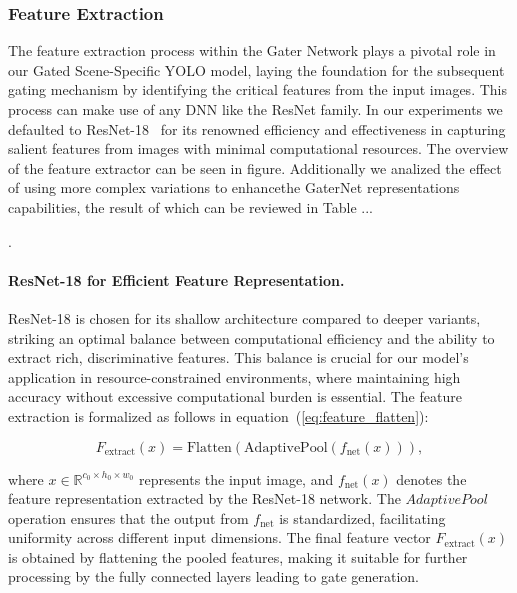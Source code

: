\subsubsection{Feature Extraction}
The feature extraction process within the Gater Network plays a pivotal role in our Gated Scene-Specific YOLO model, laying the foundation for the subsequent gating mechanism by identifying the critical features from the input images. This process can make use of any DNN like the ResNet family. In our experiments we defaulted to ResNet-18~\cite{he2016deep} for its renowned efficiency and effectiveness in capturing salient features from images with minimal computational resources. The overview of the feature extractor can be seen in figure. Additionally we analized the effect of using more complex variations to enhancethe GaterNet representations capabilities, the result of which can be reviewed in Table ... .

\paragraph{ResNet-18 for Efficient Feature Representation.} ResNet-18 is chosen for its shallow architecture compared to deeper variants, striking an optimal balance between computational efficiency and the ability to extract rich, discriminative features. This balance is crucial for our model's application in resource-constrained environments, where maintaining high accuracy without excessive computational burden is essential. The feature extraction is formalized as follows in equation~(\ref{eq:feature_flatten}):

\begin{equation}
    F_{\text{extract}}(x) = \text{Flatten}(\text{AdaptivePool}(f_{\text{net}}(x))),
    \label{eq:feature_flatten}
\end{equation}

where \(x \in \mathbb{R}^{c_0 \times h_0 \times w_0}\) represents the input image, and \(f_{\text{net}}(x)\) denotes the feature representation extracted by the ResNet-18 network. The \(AdaptivePool\) operation ensures that the output from \(f_{\text{net}}\) is standardized, facilitating uniformity across different input dimensions. The final feature vector \(F_{\text{extract}}(x)\) is obtained by flattening the pooled features, making it suitable for further processing by the fully connected layers leading to gate generation.

